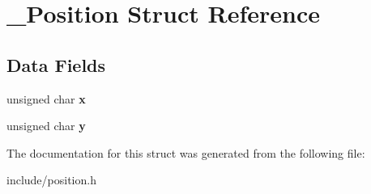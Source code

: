 \hypertarget{struct___position}{\section{\-\_\-\-Position Struct Reference}
\label{struct___position}
}
\subsection*{Data Fields}
\begin{DoxyCompactItemize}
\item 
\hypertarget{struct___position_ac1d1eed6a8bbca26af335b9682a6475e}{unsigned char {\bfseries x}}\label{struct___position_ac1d1eed6a8bbca26af335b9682a6475e}

\item 
\hypertarget{struct___position_ac553850cf16d4c4f5812f7411e2b2b5a}{unsigned char {\bfseries y}}\label{struct___position_ac553850cf16d4c4f5812f7411e2b2b5a}

\end{DoxyCompactItemize}


The documentation for this struct was generated from the following file\-:\begin{DoxyCompactItemize}
\item 
include/position.\-h\end{DoxyCompactItemize}

